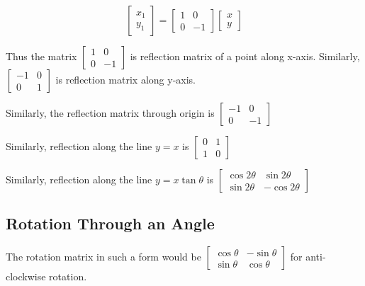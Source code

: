 $$\begin{bmatrix}x_1\\y_1\end{bmatrix} = \begin{bmatrix}1 & 0 \\ 0 &
-1\end{bmatrix} \begin{bmatrix}x \\ y\end{bmatrix}$$

Thus the matrix $\begin{bmatrix}1 & 0 \\ 0 & -1\end{bmatrix}$ is
reflection matrix of a point along x-axis. Similarly, $\begin{bmatrix}-1
& 0 \\ 0 & 1\end{bmatrix}$ is reflection matrix along y-axis.

Similarly, the reflection matrix through origin is $\begin{bmatrix}-1
& 0 \\ 0 & -1\end{bmatrix}$

Similarly, reflection along the line $y = x$ is $\begin{bmatrix}0 &
1 \\ 1 & 0\end{bmatrix}$

Similarly, reflection along the line $y = x\tan\theta$ is
$\begin{bmatrix}\cos 2\theta & \sin 2\theta \\ \sin 2\theta & -\cos
2\theta\end{bmatrix}$

\subsection{Rotation Through an Angle}
The rotation matrix in such a form would be $\begin{bmatrix}\cos\theta &
-\sin\theta \\ \sin\theta & \cos\theta\end{bmatrix}$ for anti-clockwise
rotation.

